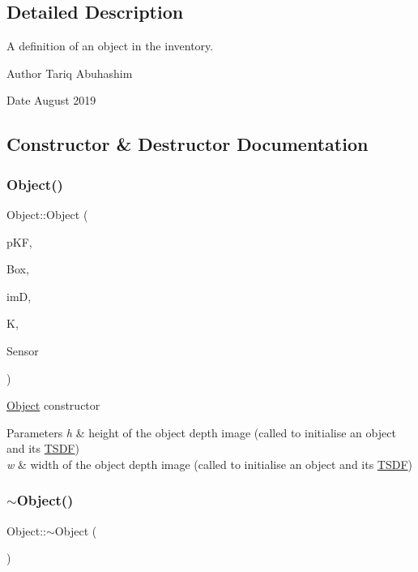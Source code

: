 \subsection{Detailed Description}
A definition of an object in the inventory. 

\begin{DoxyAuthor}{Author}
Tariq Abuhashim 
\end{DoxyAuthor}
\begin{DoxyDate}{Date}
August 2019 
\end{DoxyDate}


\subsection{Constructor \& Destructor Documentation}
\mbox{\label{classObject_a8710a1b07956b7eadc6b05563fbb6016}} 
\subsubsection{\texorpdfstring{Object()}{Object()}}
{\footnotesize\ttfamily Object\+::\+Object (\begin{DoxyParamCaption}\item[{Key\+Frame $\ast$}]{p\+KF,  }\item[{cv\+::\+Rect}]{Box,  }\item[{cv\+::\+Mat}]{imD,  }\item[{cv\+::\+Mat}]{K,  }\item[{int}]{Sensor }\end{DoxyParamCaption})}

\hyperlink{classObject}{Object} constructor 
\begin{DoxyParams}{Parameters}
{\em h} & height of the object depth image (called to initialise an object and its \hyperlink{classTSDF}{T\+S\+DF}) \\
\hline
{\em w} & width of the object depth image (called to initialise an object and its \hyperlink{classTSDF}{T\+S\+DF}) \\
\hline
\end{DoxyParams}
\mbox{\label{classObject_ae8f5483f459e46687bd01e6f9977afd3}} 
\subsubsection{\texorpdfstring{$\sim$\+Object()}{~Object()}}
{\footnotesize\ttfamily Object\+::$\sim$\+Object (\begin{DoxyParamCaption}{ }\end{DoxyParamCaption})}

